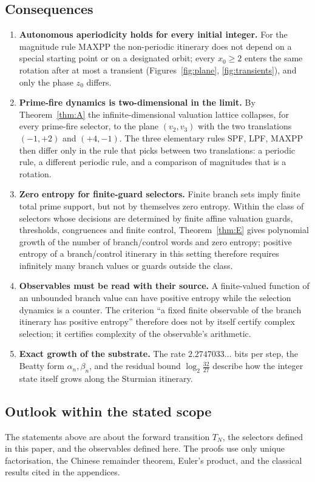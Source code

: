 \subsection{Consequences}
\begin{enumerate}[label=(\arabic*),itemsep=2pt]
\item \textbf{Autonomous aperiodicity holds for every initial integer.} For the magnitude rule \textsf{MAXPP} the non-periodic itinerary does not depend on a special starting point or on a designated orbit; every $x_0\ge2$ enters the same rotation after at most a transient (Figures~\ref{fig:plane}, \ref{fig:transients}), and only the phase $z_0$ differs.
\item \textbf{Prime-fire dynamics is two-dimensional in the limit.} By Theorem~\ref{thm:A} the infinite-dimensional valuation lattice collapses, for every prime-fire selector, to the plane $(v_2,v_3)$ with the two translations $(-1,+2)$ and $(+4,-1)$. The three elementary rules \textsf{SPF}, \textsf{LPF}, \textsf{MAXPP} then differ only in the rule that picks between two translations: a periodic rule, a different periodic rule, and a comparison of magnitudes that is a rotation.
\item \textbf{Zero entropy for finite-guard selectors.} Finite branch sets imply finite total prime support, but not by themselves zero entropy. Within the class of selectors whose decisions are determined by finite affine valuation guards, thresholds, congruences and finite control, Theorem~\ref{thm:E} gives polynomial growth of the number of branch/control words and zero entropy; positive entropy of a branch/control itinerary in this setting therefore requires infinitely many branch values or guards outside the class.
\item \textbf{Observables must be read with their source.} A finite-valued function of an unbounded branch value can have positive entropy while the selection dynamics is a counter. The criterion ``a fixed finite observable of the branch itinerary has positive entropy'' therefore does not by itself certify complex selection; it certifies complexity of the observable's arithmetic.
\item \textbf{Exact growth of the substrate.} The rate $2.2747033\ldots$ bits per step, the Beatty form $\alpha_n,\beta_n$, and the residual bound $\log_2\frac{32}{27}$ describe how the integer state itself grows along the Sturmian itinerary.
\end{enumerate}

\subsection{Outlook within the stated scope}
The statements above are about the forward transition $T_N$, the selectors defined in this paper, and the observables defined here. The proofs use only unique factorisation, the Chinese remainder theorem, Euler's product, and the classical results cited in the appendices.

